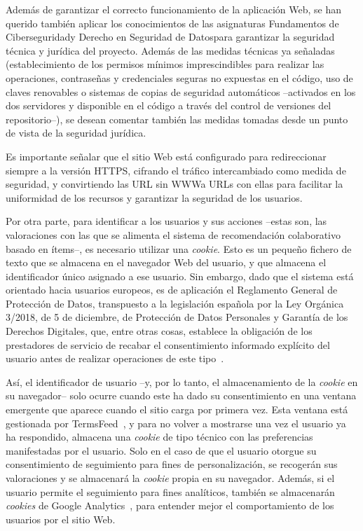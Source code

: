 Además de garantizar el correcto funcionamiento de la aplicación Web, se han querido también aplicar los conocimientos de las asignaturas \guillemotleft Fundamentos de Ciberseguridad\guillemotright\space y \guillemotleft Derecho en Seguridad de Datos\guillemotright\space para garantizar la seguridad técnica y jurídica del proyecto. Además de las medidas técnicas ya señaladas (establecimiento de los permisos mínimos imprescindibles para realizar las operaciones, contraseñas y credenciales seguras no expuestas en el código, uso de claves renovables o sistemas de copias de seguridad automáticos –activados en los dos servidores y disponible en el código a través del control de versiones del repositorio–), se desean comentar también las medidas tomadas desde un punto de vista de la seguridad jurídica.

Es importante señalar que el sitio Web está configurado para redireccionar siempre a la versión HTTPS, cifrando el tráfico intercambiado como medida de seguridad, y convirtiendo las URL sin \guillemotleft WWW\guillemotright\space a URLs con ellas para facilitar la uniformidad de los recursos y garantizar la seguridad de los usuarios.

Por otra parte, para identificar a los usuarios y sus acciones –estas son, las valoraciones con las que se alimenta el sistema de recomendación colaborativo basado en ítems–, es necesario utilizar una \textit{cookie}. Esto es un pequeño fichero de texto que se almacena en el navegador Web del usuario, y que almacena el identificador único asignado a ese usuario. Sin embargo, dado que el sistema está orientado hacia usuarios europeos, es de aplicación el Reglamento General de Protección de Datos, transpuesto a la legislación española por la Ley Orgánica 3/2018, de 5 de diciembre, de Protección de Datos Personales y Garantía de los Derechos Digitales, que, entre otras cosas, establece la obligación de los prestadores de servicio de recabar el consentimiento informado explícito del usuario antes de realizar operaciones de este tipo~\cite{GDPR_ESP}.

Así, el identificador de usuario –y, por lo tanto, el almacenamiento de la \textit{cookie} en su navegador– solo ocurre cuando este ha dado su consentimiento en una ventana emergente que aparece cuando el sitio carga por primera vez. Esta ventana está gestionada por TermsFeed~\cite{TermsFeed}, y para no volver a mostrarse una vez el usuario ya ha respondido, almacena una \textit{cookie} de tipo técnico con las preferencias manifestadas por el usuario. Solo en el caso de que el usuario otorgue su consentimiento de seguimiento para fines de personalización, se recogerán sus valoraciones y se almacenará la \textit{cookie} propia en su navegador. Además, si el usuario permite el seguimiento para fines analíticos, también se almacenarán \textit{cookies} de Google Analytics~\cite{analytics}, para entender mejor el comportamiento de los usuarios por el sitio Web.

